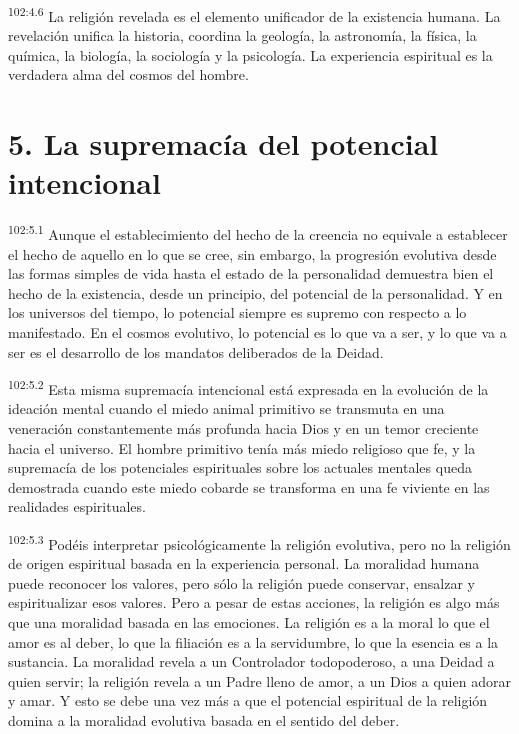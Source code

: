 \documentclass[twoside, 11pt]{book}
\begin{document}
\par
\textsuperscript{102:4.6} La religión revelada es el elemento unificador de la existencia humana. La revelación unifica la historia, coordina la geología, la astronomía, la física, la química, la biología, la sociología y la psicología. La experiencia espiritual es la verdadera alma del cosmos del hombre.

\section*{5. La supremacía del potencial intencional}
\par
\textsuperscript{102:5.1} Aunque el establecimiento del hecho de la creencia no equivale a establecer el hecho de aquello en lo que se cree, sin embargo, la progresión evolutiva desde las formas simples de vida hasta el estado de la personalidad demuestra bien el hecho de la existencia, desde un principio, del potencial de la personalidad. Y en los universos del tiempo, lo potencial siempre es supremo con respecto a lo manifestado. En el cosmos evolutivo, lo potencial es lo que va a ser, y lo que va a ser es el desarrollo de los mandatos deliberados de la Deidad.

\par
\textsuperscript{102:5.2} Esta misma supremacía intencional está expresada en la evolución de la ideación mental cuando el miedo animal primitivo se transmuta en una veneración constantemente más profunda hacia Dios y en un temor creciente hacia el universo. El hombre primitivo tenía más miedo religioso que fe, y la supremacía de los potenciales espirituales sobre los actuales mentales queda demostrada cuando este miedo cobarde se transforma en una fe viviente en las realidades espirituales.

\par
\textsuperscript{102:5.3} Podéis interpretar psicológicamente la religión evolutiva, pero no la religión de origen espiritual basada en la experiencia personal. La moralidad humana puede reconocer los valores, pero sólo la religión puede conservar, ensalzar y espiritualizar esos valores. Pero a pesar de estas acciones, la religión es algo más que una moralidad basada en las emociones. La religión es a la moral lo que el amor es al deber, lo que la filiación es a la servidumbre, lo que la esencia es a la sustancia. La moralidad revela a un Controlador todopoderoso, a una Deidad a quien servir; la religión revela a un Padre lleno de amor, a un Dios a quien adorar y amar. Y esto se debe una vez más a que el potencial espiritual de la religión domina a la moralidad evolutiva basada en el sentido del deber.
\end{document}
